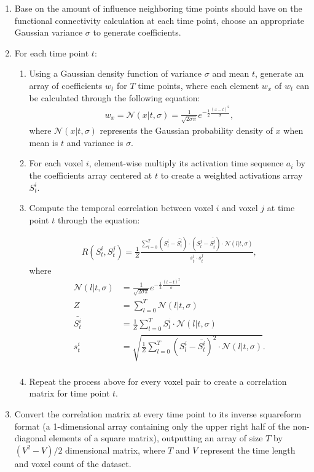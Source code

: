 \documentclass[11pt]{article}
\begin{document}
\begin{enumerate}
\item Base on the amount of influence neighboring time points should have on the functional connectivity calculation at each time point, choose an appropriate Gaussian variance $\sigma$ to generate coefficients.

\item For each time point $t$:
\begin{enumerate}
\item Using a Gaussian density function of variance $\sigma$ and mean $t$, generate an array of coefficients $w_t$ for $T$ time points, where each element $w_x$ of $w_t$ can be calculated through the following equation:
\begin{align*}
w_x = \mathcal{N}(x|t,\sigma) = \frac{1}{\sqrt{2\sigma\pi}}e^{-\frac12 \frac{(x-t)^2}{\sigma}},
\end{align*}
where $\mathcal{N}(x|t,\sigma)$ represents the Gaussian probability density of $x$ when mean is $t$ and variance is $\sigma$.

\item For each voxel $i$, element-wise multiply its activation time sequence $a_i$ by the coefficients array centered at $t$ to create a weighted activations array $S^i_t$.

\item Compute the temporal correlation between voxel $i$ and voxel $j$ at time point $t$ through the equation:

\begin{align*}
R(S^i_t,S^j_t) = \frac{1}{Z}\frac{\sum_{l=0}^T (S_l^i - \bar{S^i_t})\cdot(S^j_l - \bar{S^j_t})\cdot \mathcal{N}(l|t,\sigma)}{s_t^i \cdot s_t^j},
\end{align*}
where
\begin{align*}
\mathcal{N}(l|t,\sigma) &= \frac{1}{\sqrt{2\sigma\pi}}e^{-\frac12 \frac{(l-t)^2}{\sigma}}\\
Z &= \sum_{l=0}^T \mathcal{N}(l|t,\sigma)\\
\bar{S^i_t} &=\frac{1}{Z} \sum_{l=0}^T S^i_l \cdot \mathcal{N}(l|t,\sigma)\\
s_t^i &=\sqrt{ \frac{1}{Z}\sum_{l=0}^T (S_l^i-\bar{S_t^i})^2 \cdot \mathcal{N}(l|t,\sigma)}.\\
\end{align*}
\item Repeat the process above for every voxel pair to create a correlation matrix for time point $t$.
\end{enumerate}
\item Convert the correlation matrix at every time point to its inverse squareform format (a 1-dimensional array containing only the upper right half of the non-diagonal elements of a square matrix), outputting an array of size $T$ by $(V^2-V)/2$ dimensional matrix, where $T$ and $V$ represent the time length and voxel count of the dataset.
\end{enumerate}
\end{document}
